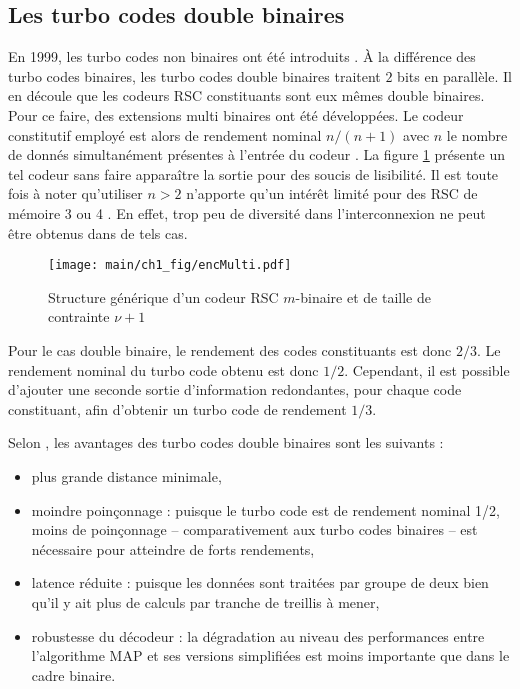 \subsection{Les turbo codes double binaires}\label{sec:dbl}
En 1999, les turbo codes non binaires ont été introduits \cite{doublebin1}. À la différence des turbo codes binaires, les 
turbo codes double binaires traitent $2$ bits en parallèle. Il en découle que les codeurs RSC constituants sont eux mêmes 
double binaires. Pour ce faire, des extensions multi binaires ont été développées. Le codeur constitutif employé est alors 
de rendement nominal $n/(n+1)$ avec $n$ le nombre de donnés simultanément présentes à l'entrée du codeur \cite{doublebin3}. 
La figure \ref{fig:encMulti} présente un tel codeur sans faire apparaître la sortie pour des soucis de lisibilité. Il est 
toute fois à noter qu'utiliser $n > 2$ n'apporte qu'un intérêt limité pour des RSC de mémoire 3 ou 4 \cite{Balta2013}. En 
effet, trop peu de diversité dans l'interconnexion ne peut être obtenus dans de tels cas.
\begin{figure}[!h]
	\centering
	\texttt{[image: main/ch1\_fig/encMulti.pdf]}
	\caption{\label{fig:encMulti} Structure générique d'un codeur RSC $m$-binaire et de taille de contrainte $\nu +1$}
\end{figure}

Pour le cas double binaire, le rendement des codes constituants est donc $2/3$. Le rendement nominal du turbo code obtenu 
est donc $1/2$. Cependant, il est possible d'ajouter une seconde sortie  d'information redondantes, pour chaque code 
constituant, afin d'obtenir un turbo code de rendement $1/3$. 

Selon \cite{doublebinadvantages}, les avantages des turbo codes double binaires sont les suivants : 
\begin{itemize}
	\item plus grande distance minimale,
	\item moindre poinçonnage : puisque le turbo code est de rendement nominal 1/2, moins de poinçonnage -- comparativement 
	aux turbo codes binaires -- est nécessaire pour atteindre de forts rendements,
	\item latence réduite : puisque les données sont traitées par groupe de deux bien qu'il y ait plus de calculs par 
	tranche de treillis à mener,
	\item robustesse du décodeur : la dégradation au niveau des performances entre l'algorithme MAP et ses versions 
	simplifiées est moins importante que dans le cadre binaire.
\end{itemize}

